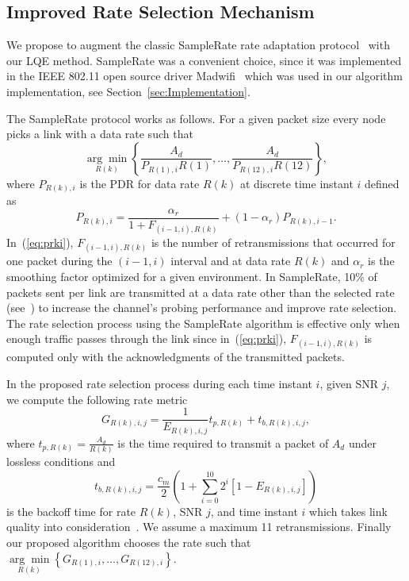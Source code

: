 \documentclass[11pt,draftclsnofoot,journal,onecolumn]{IEEEtran}
\begin{document}
\subsection{Improved Rate Selection Mechanism}
\label{sec:SNR_RATE}

We propose to augment the classic SampleRate rate adaptation protocol~\cite{Bicket_SampleRate_2005} with our LQE method. SampleRate was a convenient choice, since it was implemented in the IEEE 802.11 open source driver Madwifi~\cite{MadWifi} which was used in our algorithm implementation, see Section~\ref{sec:Implementation}.

The SampleRate protocol works as follows. For a given packet size every node picks a link with a data rate such that
\begin{equation}
\underset{R(k)}{\arg \min}\left\{\frac{A_d}{P_{R(1),i}R(1)},\ldots,\frac{A_d}{P_{R(12),i}R(12)}\right\},
\label{eq:minrate}
\end{equation}
where $P_{R(k),i}$ is the PDR for data rate $R(k)$ at discrete time instant $i$ defined as
\begin{equation}
P_{R(k),i}=\frac{\alpha_r}{1+F_{(i-1,i),R(k)}}+(1-\alpha_r)P_{R(k),i-1}.
\label{eq:prki}
\end{equation}
In~(\ref{eq:prki}), $F_{(i-1,i),R(k)}$ is the number of retransmissions that occurred for one packet during the $(i-1,i)$ interval and at data rate $R(k)$ and $\alpha_r$ is the smoothing factor optimized for a given environment. In SampleRate, 10\% of packets sent per link are transmitted at a data rate other than the selected rate (see~\cite[Ch. 5]{Bicket_SampleRate_2005}) to increase the channel's probing performance and improve rate selection. The rate selection process using the SampleRate algorithm is effective only when enough traffic passes through the link since in~(\ref{eq:prki}), $F_{(i-1,i),R(k)}$ is computed only with the acknowledgments of the transmitted packets.

In the proposed rate selection process during each time instant $i$, given SNR $j$, we compute the following rate metric
\begin{equation}
G_{R(k),i,j}=\frac{1}{E_{R(k),i,j}}t_{p,R(k)}+t_{b,R(k),i,j},
\end{equation}
where $t_{p,R(k)}=\frac{A_d}{R(k)}$ is the time required to transmit a packet of $A_d$ under lossless conditions and
\begin{equation}
t_{b,R(k),i,j}=\frac{c_m}{2}\left(1+\sum_{i=0}^{10}2^i[1-E_{R(k),i,j}]\right)
\end{equation}
is the backoff time for rate $R(k)$, SNR $j$, and time instant $i$ which takes link quality into consideration~\cite[Eq. 17]{Draves_MobiCom_2004}. We assume a maximum 11 retransmissions. Finally our proposed algorithm chooses the rate such that $\underset{R(k)}{\arg \min}\left\{G_{R(1),i},\ldots, G_{R(12),i}\right\}$.
\end{document}
